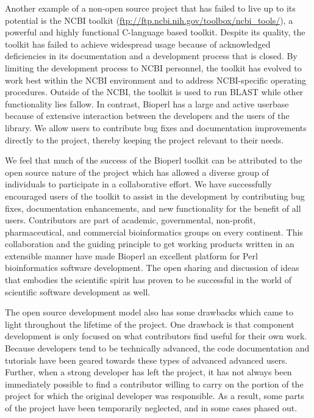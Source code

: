 \documentclass[12pt]{article}
\begin{document}
Another example of a non-open source project that has failed to live
up to its potential is the NCBI toolkit
(\url{ftp://ftp.ncbi.nih.gov/toolbox/ncbi_tools/}), a powerful and
highly functional C-language based toolkit.  Despite its quality, the
toolkit has failed to achieve widespread usage because of acknowledged
deficiencies in its documentation and a development process that is
closed.  By limiting the development process to NCBI personnel, the
toolkit has evolved to work best within the NCBI environment and to
address NCBI-specific operating procedures.  Outside of the NCBI, the
toolkit is used to run BLAST while other functionality lies fallow.
In contrast, Bioperl has a large and active userbase because of
extensive interaction between the developers and the users of the
library.  We allow users to contribute bug fixes and documentation
improvements directly to the project, thereby keeping the project
relevant to their needs.

We feel that much of the success of the Bioperl toolkit can be
attributed to the open source nature of the project which has allowed
a diverse group of individuals to participate in a collaborative effort.
We have successfully encouraged users of the toolkit to assist in the
development by contributing bug fixes, documentation enhancements, and
new functionality for the benefit of all users.  Contributors are part
of academic, governmental, non-profit, pharmaceutical, and
commercial bioinformatics groups on every continent.  This collaboration and
the guiding principle to get working products written in an extensible
manner have made Bioperl an excellent platform for Perl bioinformatics
software development.  The open sharing and discussion of ideas that
embodies the scientific spirit has proven to be successful in the
world of scientific software development as well.  


The open source development model also has some drawbacks which came
to light throughout the lifetime of the project.  One drawback is that
component development is only focused on what contributors find useful
for their own work.  Because developers tend to be technically
advanced, the code documentation and tutorials have been geared
towards these types of advanced advanced users.  Further, when a
strong developer has left the project, it has not always been
immediately possible to find a contributor willing to carry on the
portion of the project for which the original developer was
responsible.  As a result, some parts of the project have been
temporarily neglected, and in some cases phased out.
\end{document}
